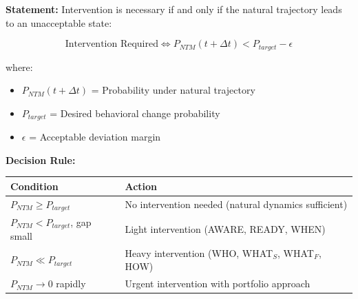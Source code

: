 \documentclass[11pt, a4paper]{article}
\begin{document}
\begin{tcolorbox}[colback=purple!5!white, colframe=purple!75!black,
    title=\textbf{Theorem NTM-T2: Intervention Necessity Criterion}]

\textbf{Statement:} Intervention is necessary if and only if the natural trajectory leads to an unacceptable state:

\begin{equation}
\text{Intervention Required} \Leftrightarrow P_{NTM}(t + \Delta t) < P_{target} - \epsilon
\end{equation}

where:
\begin{itemize}[nosep]
\item $P_{NTM}(t + \Delta t)$ = Probability under natural trajectory
\item $P_{target}$ = Desired behavioral change probability
\item $\epsilon$ = Acceptable deviation margin
\end{itemize}

\textbf{Decision Rule:}
\begin{center}
\renewcommand{\arraystretch}{1.2}
\begin{tabular}{@{}ll@{}}
\toprule
\textbf{Condition} & \textbf{Action} \\
\midrule
$P_{NTM} \geq P_{target}$ & No intervention needed (natural dynamics sufficient) \\
$P_{NTM} < P_{target}$, gap small & Light intervention (AWARE, READY, WHEN) \\
$P_{NTM} \ll P_{target}$ & Heavy intervention (WHO, WHAT$_S$, WHAT$_F$, HOW) \\
$P_{NTM} \to 0$ rapidly & Urgent intervention with portfolio approach \\
\bottomrule
\end{tabular}
\end{center}

\end{tcolorbox}
\end{document}
